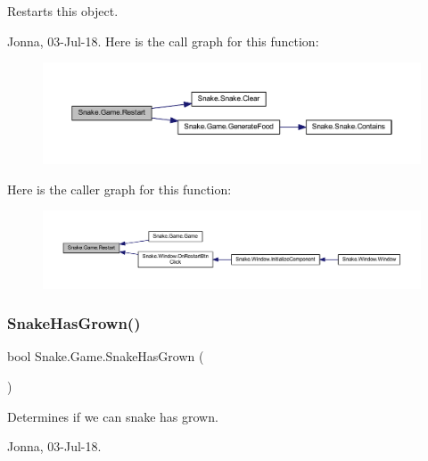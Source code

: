 Restarts this object. 

Jonna, 03-\/\+Jul-\/18. Here is the call graph for this function\+:
\nopagebreak
\begin{figure}[H]
\begin{center}
\leavevmode
\includegraphics[width=350pt]{d5/d72/class_snake_1_1_game_ae3bcefb730cb41ecfc315da121687315_cgraph}
\end{center}
\end{figure}
Here is the caller graph for this function\+:
\nopagebreak
\begin{figure}[H]
\begin{center}
\leavevmode
\includegraphics[width=350pt]{d5/d72/class_snake_1_1_game_ae3bcefb730cb41ecfc315da121687315_icgraph}
\end{center}
\end{figure}
\mbox{\label{class_snake_1_1_game_a923f13e9e2c28d914b83cf28fcb2c7a3}} 
\subsubsection{\texorpdfstring{Snake\+Has\+Grown()}{SnakeHasGrown()}}
{\footnotesize\ttfamily bool Snake.\+Game.\+Snake\+Has\+Grown (\begin{DoxyParamCaption}{ }\end{DoxyParamCaption})}



Determines if we can snake has grown. 

Jonna, 03-\/\+Jul-\/18. 

